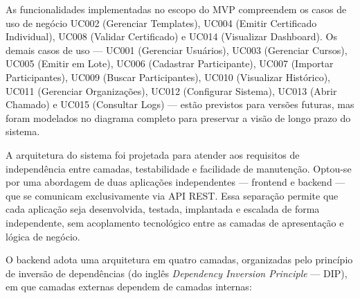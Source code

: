 As funcionalidades implementadas no escopo do MVP compreendem os casos de uso de negócio UC002 (Gerenciar Templates), UC004 (Emitir Certificado Individual), UC008 (Validar Certificado) e UC014 (Visualizar Dashboard). Os demais casos de uso --- UC001 (Gerenciar Usuários), UC003 (Gerenciar Cursos), UC005 (Emitir em Lote), UC006 (Cadastrar Participante), UC007 (Importar Participantes), UC009 (Buscar Participantes), UC010 (Visualizar Histórico), UC011 (Gerenciar Organizações), UC012 (Configurar Sistema), UC013 (Abrir Chamado) e UC015 (Consultar Logs) --- estão previstos para versões futuras, mas foram modelados no diagrama completo para preservar a visão de longo prazo do sistema.








A arquitetura do sistema foi projetada para atender aos requisitos de independência entre camadas, testabilidade e facilidade de manutenção. Optou-se por uma abordagem de duas aplicações independentes --- frontend e backend --- que se comunicam exclusivamente via API REST. Essa separação permite que cada aplicação seja desenvolvida, testada, implantada e escalada de forma independente, sem acoplamento tecnológico entre as camadas de apresentação e lógica de negócio.

O backend adota uma arquitetura em quatro camadas, organizadas pelo princípio de inversão de dependências (do inglês \textit{Dependency Inversion Principle} — DIP), em que camadas externas dependem de camadas internas:

